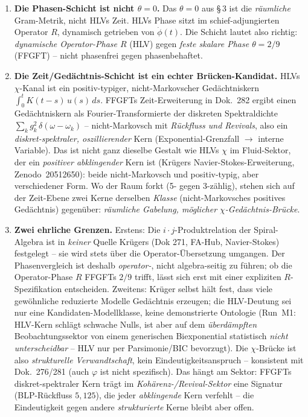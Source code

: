 \begin{enumerate}
\item \textbf{Die Phasen-Schicht ist nicht $\theta=0$.} Das $\theta=0$ aus §\,3 ist
die \emph{räumliche} Gram-Metrik, nicht HLVs Zeit. HLVs Phase sitzt im
schief-adjungierten Operator $R$, dynamisch getrieben von $\dot\phi(t)$. Die Schicht
lautet also richtig: \emph{dynamische Operator-Phase $R$} (HLV) gegen \emph{feste
skalare Phase $\theta=2/9$} (FFGFT) -- nicht phasenfrei gegen phasenbehaftet.

\item \textbf{Die Zeit/Gedächtnis-Schicht ist ein echter Brücken-Kandidat.} HLVs
$\chi$-Kanal ist ein positiv-typiger, nicht-Markovscher Gedächtniskern
$\int_0^t K(t-s)\,u(s)\,ds$. FFGFTs Zeit-Erweiterung in Dok.~282 ergibt einen
Gedächtniskern als Fourier-Transformierte der diskreten Spektraldichte
$\sum_k g_k^2\,\delta(\omega-\omega_k)$ -- nicht-Markovsch mit \emph{Rückfluss und
Revivals}, also ein \emph{diskret-spektraler, oszillierender} Kern
(Exponential-Grenzfall $\to$ interne Variable). Das ist nicht ganz dieselbe Gestalt
wie HLVs $\chi$ im Fluid-Sektor, der ein \emph{positiver abklingender} Kern ist
(Krügers Navier-Stokes-Erweiterung, Zenodo~20512650): beide nicht-Markovsch und
positiv-typig, aber verschiedener Form. Wo der Raum forkt (5- gegen 3-zählig), stehen
sich auf der Zeit-Ebene zwei Kerne derselben \emph{Klasse} (nicht-Markovsches
positives Gedächtnis) gegenüber: \emph{räumliche Gabelung, möglicher
$\chi$-Gedächtnis-Brücke}.

\item \textbf{Zwei ehrliche Grenzen.} Erstens: Die $i\!\cdot\!j$-Produktrelation der
Spiral-Algebra ist in \emph{keiner} Quelle Krügers (Dok 271, FA-Hub, Navier-Stokes)
festgelegt -- sie wird stets über die Operator-Übersetzung umgangen. Der
Phasenvergleich ist deshalb \emph{operator-}, nicht algebra-seitig zu führen; ob die
Operator-Phase $R$ FFGFTs $2/9$ trifft, lässt sich erst mit einer expliziten
$R$-Spezifikation entscheiden. Zweitens: Krüger selbst hält fest, dass viele
gewöhnliche reduzierte Modelle Gedächtnis erzeugen; die HLV-Deutung sei nur eine
Kandidaten-Modellklasse, keine demonstrierte Ontologie (Run~M1: HLV-Kern schlägt
schwache Nulls, ist aber auf dem \emph{überdämpften} Beobachtungssektor von einem
generischen Biexponential statistisch \emph{nicht unterscheidbar} -- HLV nur per
Parsimonie/BIC bevorzugt). Die $\chi$-Brücke ist also \emph{strukturelle
Verwandtschaft}, kein Eindeutigkeitsanspruch -- konsistent mit Dok.~276/281 (auch
$\varphi$ ist nicht spezifisch). Das hängt am Sektor: FFGFTs diskret-spektraler Kern
trägt im \emph{Kohärenz-/Revival-Sektor} eine Signatur (BLP-Rückfluss $5{,}125$), die
jeder \emph{abklingende} Kern verfehlt -- die Eindeutigkeit gegen andere
\emph{strukturierte} Kerne bleibt aber offen.
\end{enumerate}

